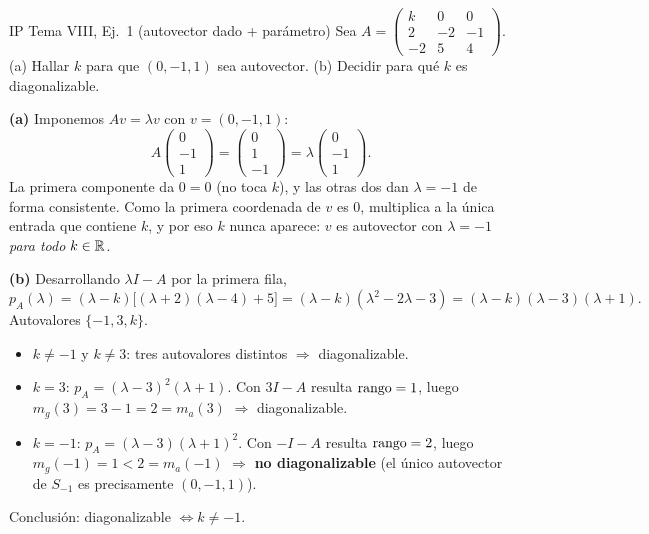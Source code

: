 \begin{ejemplo}{IP Tema VIII, Ej.\ 1 (autovector dado + parámetro)}
Sea $A = \begin{pmatrix} k & 0 & 0 \\ 2 & -2 & -1 \\ -2 & 5 & 4 \end{pmatrix}$. (a) Hallar $k$ para que $(0,-1,1)$ sea autovector. (b) Decidir para qué $k$ es diagonalizable.

\textbf{(a)} Imponemos $Av = \lambda v$ con $v = (0,-1,1)$:
\[
A \begin{pmatrix} 0 \\ -1 \\ 1 \end{pmatrix} = \begin{pmatrix} 0 \\ 1 \\ -1 \end{pmatrix} = \lambda \begin{pmatrix} 0 \\ -1 \\ 1 \end{pmatrix}.
\]
La primera componente da $0 = 0$ (no toca $k$), y las otras dos dan $\lambda = -1$ de forma consistente. Como la primera coordenada de $v$ es $0$, multiplica a la única entrada que contiene $k$, y por eso $k$ nunca aparece: $v$ es autovector con $\lambda = -1$ \emph{para todo} $k \in \mathbb{R}$.

\textbf{(b)} Desarrollando $\lambda I - A$ por la primera fila,
\[
p_A(\lambda) = (\lambda - k)\bigl[(\lambda + 2)(\lambda - 4) + 5\bigr] = (\lambda - k)(\lambda^2 - 2\lambda - 3) = (\lambda - k)(\lambda - 3)(\lambda + 1).
\]
Autovalores $\{-1, 3, k\}$.
\begin{itemize}
\item $k \neq -1$ y $k \neq 3$: tres autovalores distintos $\Rightarrow$ diagonalizable.
\item $k = 3$: $p_A = (\lambda - 3)^2(\lambda + 1)$. Con $3I - A$ resulta $\operatorname{rango} = 1$, luego $m_g(3) = 3 - 1 = 2 = m_a(3)$ $\Rightarrow$ diagonalizable.
\item $k = -1$: $p_A = (\lambda - 3)(\lambda + 1)^2$. Con $-I - A$ resulta $\operatorname{rango} = 2$, luego $m_g(-1) = 1 < 2 = m_a(-1)$ $\Rightarrow$ \textbf{no diagonalizable} (el único autovector de $S_{-1}$ es precisamente $(0,-1,1)$).
\end{itemize}
Conclusión: diagonalizable $\iff k \neq -1$.
\end{ejemplo}

